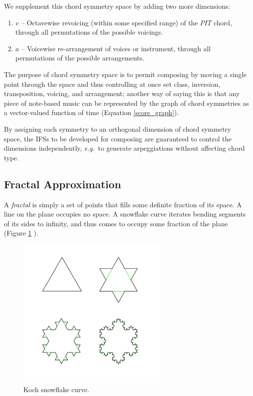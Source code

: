 \documentclass[english,11pt,letterpaper,onecolumn]{scrartcl}
\numberwithin{equation}{section}
\begin{document}
\noindent We supplement this chord symmetry space by adding two more dimensions:

\begin{enumerate}[resume]
\item $v$ -- Octavewise revoicing (within some specified range) of the $PIT$
chord, through all permutations of the possible voicings.
\item $a$ -- Voicewise re-arrangement of voices or instrument, through all
permutations of the possible arrangements.
\end{enumerate}

\noindent The purpose of chord symmetry space is to permit composing by moving a
single point through the space and thus controlling at once set class,
inversion, transposition, voicing, and arrangement; another way of saying this
is that any piece of note-based music can be represented by the graph of chord
symmetries as a vector-valued function of time (Equation \eqref{score_graph}).

By assigning each symmetry to an orthogonal dimension of chord symmetry space,
the IFSs to be developed for composing are guaranteed to control the dimensions
independently, \textit{e.g.}\ to generate arpeggiations without affecting chord
type.

\subsection{Fractal Approximation}

A \textit{fractal} is simply a set of points that fills some definite fraction
of its space. A line on the plane occupies no space. A snowflake curve
iterates bending segments of its sides to infinity, and thus comes to occupy
some fraction of the plane (Figure \ref{fig:kochflake}
\cite{Mandelbrot:1982:FGN}).

\begin{figure}
\centerline{\includegraphics[width = 0.6667\textwidth]{KochFlake}}
\caption{\label{fig:kochflake} Koch snowflake
curve.\protect\footnotemark}
\end{figure}
\end{document}
